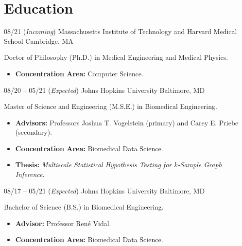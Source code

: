 \section{Education}

\cventry
{08/21 (\textit{Incoming})}
{Massachusetts Institute of Technology and Harvard Medical School}
{}
{Cambridge, MA}
{}
{
Doctor of Philosophy (Ph.D.) in Medical Engineering and Medical Physics.
\begin{itemize}
    \item \textbf{Concentration Area:} Computer Science.
\end{itemize}
}


\cventry
{08/20 -- 05/21 (\textit{Expected})}
{Johns Hopkins University}
{}
{Baltimore, MD}
{}
{
Master of Science and Engineering (M.S.E.) in Biomedical Engineering.
\begin{itemize}
    \item \textbf{Advisors:} Professors Joshua T. Vogelstein (primary) and Carey E. Priebe (secondary).
    \item \textbf{Concentration Area:} Biomedical Data Science.
    \item \textbf{Thesis:} \textit{Multiscale Statistical Hypothesis Testing for $k$-Sample Graph Inference}.
\end{itemize}
}

\cventry
{08/17 -- 05/21 (\textit{Expected})}
{Johns Hopkins University}
{}
{Baltimore, MD}
{}
{
Bachelor of Science (B.S.) in Biomedical Engineering.
\begin{itemize}
    \item \textbf{Advisor:} Professor Ren\'{e} Vidal.
    \item \textbf{Concentration Area:} Biomedical Data Science.
\end{itemize}
}
